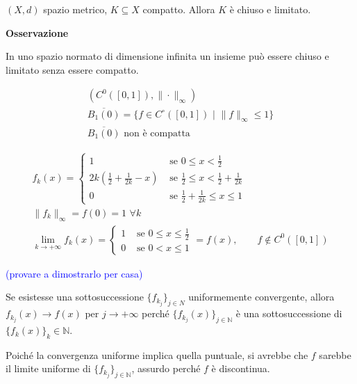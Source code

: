 \begin{theorem}
	\label{th: pag 221}
	$(X,d)$ spazio metrico, $K \subseteq X$ compatto. Allora $K$ è chiuso e limitato.
\end{theorem}
	
	
\textbf{Osservazione}

In uno spazio normato di dimensione infinita un insieme può essere chiuso e limitato senza essere compatto.

\begin{gather*} 
	(C^0([0,1]),\|\cdot\|_\infty)
	\\
	\overline{B_1(0)}=\{f\in C^\circ ([0,1])\,\, \big|\,\, \|f\|_\infty\leq 1\}
	\\
	\overline{B_1(0)} \text{ non è compatta}
\end{gather*}
 

\begin{gather*} 
	f_k(x)=
	\begin{cases}
		1 & \text{ se } 0\leq x <\frac{1}{2}
		\\
		2k(\frac{1}{2}+\frac{1}{2k}-x) &\text{ se } \frac{1}{2}\leq x <\frac{1}{2}+\frac{1}{2k}
		\\
		0 &\text{ se } \frac{1}{2}+\frac{1}{2k} \leq x \leq 1
	\end{cases}
	\\
	\|f_k\|_\infty=f(0)=1\,\, \forall k
	\\
	\lim_{k \rightarrow +\infty} f_k(x) = 
	\begin{cases}
		1 &\text{ se } 0\leq x \leq \frac{1}{2} 
		\\
		0 &\text{ se } 0 < x \leq 1
	\end{cases} 
	= f(x), \qquad f \notin C^0([0,1])
\end{gather*}

\textcolor{blue}{(provare a dimostrarlo per casa)}

Se esistesse una sottosuccessione $\{f_{k_j}\}_{j\in N}$ uniformemente convergente, allora $f_{k_j}(x)\rightarrow f(x)$ per $j \rightarrow +\infty$ perché $\{f_{k_j}(x)\}_{j\in \mathbb{N}}$ è una sottosuccessione di $\{f_k(x)\}_k\in \mathbb{N}$.

Poiché la convergenza uniforme implica quella puntuale, si avrebbe che $f$ sarebbe il limite uniforme di $\{f_{k_j}\}_{j\in\mathbb{N}}$, assurdo perché $f$ è discontinua. 
	
